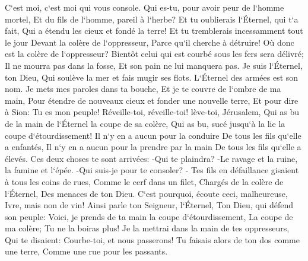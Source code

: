 \verse C`est moi, c`est moi qui vous console. Qui es-tu, pour avoir peur de l`homme mortel, Et du fils de l`homme, pareil à l`herbe? 
\verse Et tu oublierais l`Éternel, qui t`a fait, Qui a étendu les cieux et fondé la terre! Et tu tremblerais incessamment tout le jour Devant la colère de l`oppresseur, Parce qu`il cherche à détruire! Où donc est la colère de l`oppresseur? 
\verse Bientôt celui qui est courbé sous les fers sera délivré; Il ne mourra pas dans la fosse, Et son pain ne lui manquera pas. 
\verse Je suis l`Éternel, ton Dieu, Qui soulève la mer et fais mugir ses flots. L`Éternel des armées est son nom. 
\verse Je mets mes paroles dans ta bouche, Et je te couvre de l`ombre de ma main, Pour étendre de nouveaux cieux et fonder une nouvelle terre, Et pour dire à Sion: Tu es mon peuple! 
\verse Réveille-toi, réveille-toi! lève-toi, Jérusalem, Qui as bu de la main de l`Éternel la coupe de sa colère, Qui as bu, sucé jusqu`à la lie la coupe d`étourdissement! 
\verse Il n`y en a aucun pour la conduire De tous les fils qu`elle a enfantés, Il n`y en a aucun pour la prendre par la main De tous les fils qu`elle a élevés. 
\verse Ces deux choses te sont arrivées: -Qui te plaindra? -Le ravage et la ruine, la famine et l`épée. -Qui suis-je pour te consoler? - 
\verse Tes fils en défaillance gisaient à tous les coins de rues, Comme le cerf dans un filet, Chargés de la colère de l`Éternel, Des menaces de ton Dieu. 
\verse C`est pourquoi, écoute ceci, malheureuse, Ivre, mais non de vin! 
\verse Ainsi parle ton Seigneur, l`Éternel, Ton Dieu, qui défend son peuple: Voici, je prends de ta main la coupe d`étourdissement, La coupe de ma colère; Tu ne la boiras plus! 
\verse Je la mettrai dans la main de tes oppresseurs, Qui te disaient: Courbe-toi, et nous passerons! Tu faisais alors de ton dos comme une terre, Comme une rue pour les passants. 

